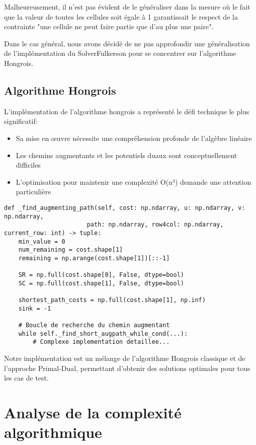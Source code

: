 \documentclass[11pt, a4paper]{article}
\begin{document}
Malheureusement, il n'est pas évident de le généraliser dans la mesure où le fait que la valeur de toutes les cellules soit égale à 1 garantissait le respect de la contrainte "une cellule ne peut faire partie que d'au plus une paire".

Dans le cas général, nous avons décidé de ne pas approfondir une généralisation de l'implémentation du SolverFulkerson pour se concentrer sur l'algorithme Hongrois.

\subsection{Algorithme Hongrois}

L'implémentation de l'algorithme hongrois a représenté le défi technique le plus significatif:
\begin{itemize}
    \item Sa mise en œuvre nécessite une compréhension profonde de l'algèbre linéaire
    \item Les chemins augmentants et les potentiels duaux sont conceptuellement difficiles
    \item L'optimisation pour maintenir une complexité O(n³) demande une attention particulière
\end{itemize}

\begin{lstlisting}[caption=Coeur de l'algorithme hongrois]
def _find_augmenting_path(self, cost: np.ndarray, u: np.ndarray, v: np.ndarray, 
                       path: np.ndarray, row4col: np.ndarray, current_row: int) -> tuple:
    min_value = 0
    num_remaining = cost.shape[1]
    remaining = np.arange(cost.shape[1])[::-1]
    
    SR = np.full(cost.shape[0], False, dtype=bool)
    SC = np.full(cost.shape[1], False, dtype=bool)
    
    shortest_path_costs = np.full(cost.shape[1], np.inf)
    sink = -1
    
    # Boucle de recherche du chemin augmentant
    while self._find_short_augpath_while_cond(...):
        # Complexe implementation detaillee...
\end{lstlisting}

Notre implémentation est un mélange de l'algorithme Hongrois classique et de l'approche Primal-Dual, permettant d'obtenir des solutions optimales pour tous les cas de test.

\section{Analyse de la complexité algorithmique}
\label{sec:complexite}
\end{document}
